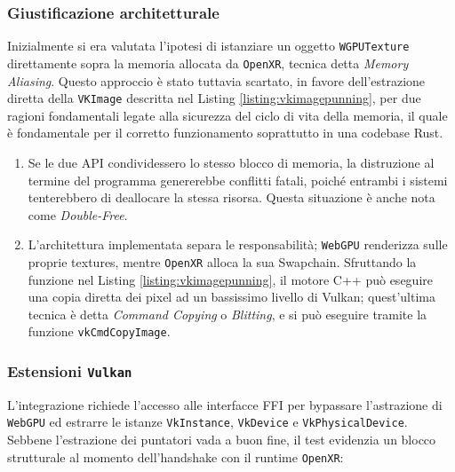 \documentclass[a4paper, 11pt, twoside]{report}
\begin{document}
\subsubsection{Giustificazione architetturale}

Inizialmente si era valutata l'ipotesi di istanziare un oggetto \texttt{WGPUTexture} direttamente sopra la memoria
allocata da \texttt{\gls{OpenXR}}, tecnica detta \textit{Memory Aliasing}.
Questo approccio è stato tuttavia scartato, in favore dell'estrazione diretta della \texttt{VKImage} descritta nel
Listing \ref{listing:vkimagepunning}, per due ragioni fondamentali legate alla sicurezza del ciclo di vita della
memoria, il quale è fondamentale per il corretto funzionamento soprattutto in una codebase Rust.

\begin{enumerate}
    \item Se le due API condividessero lo stesso blocco di memoria, la distruzione al termine del programma genererebbe
        conflitti fatali, poiché entrambi i sistemi tenterebbero di deallocare la stessa risorsa. Questa situazione è
        anche nota come \textit{Double-Free}.
    \item L'architettura implementata separa le responsabilità; \texttt{WebGPU} renderizza sulle proprie textures,
        mentre \texttt{\gls{OpenXR}} alloca la sua \gls{Swapchain}. Sfruttando la funzione nel Listing
        \ref{listing:vkimagepunning}, il motore C++ può eseguire una copia diretta dei pixel ad un bassissimo livello
        di \gls{Vulkan}; quest'ultima tecnica è detta \textit{Command Copying} o \textit{Blitting}, e si può eseguire
        tramite la funzione \texttt{vkCmdCopyImage}.
\end{enumerate}

\subsubsection{Estensioni \texttt{\gls{Vulkan}}}

L'integrazione richiede l'accesso alle interfacce FFI per bypassare l'astrazione di \texttt{WebGPU} ed estrarre
le istanze \texttt{VkInstance}, \texttt{VkDevice} e \texttt{VkPhysicalDevice}.
Sebbene l'estrazione dei puntatori vada a buon fine, il test evidenzia un blocco strutturale al momento dell'handshake
con il runtime \texttt{\gls{OpenXR}}:
\end{document}
